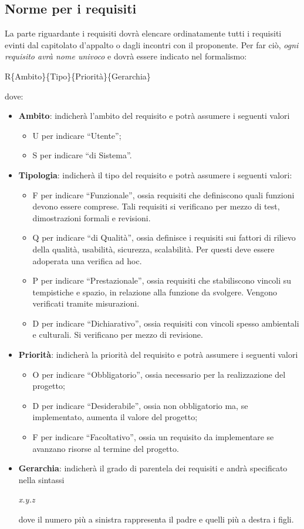 \subsection{Norme per i requisiti}
La parte riguardante i requisiti dovrà elencare ordinatamente tutti i requisiti evinti dal capitolato d'appalto o dagli incontri con il proponente. Per far ciò, \textit{ogni requisito avrà nome univoco} e dovrà essere indicato nel formalismo:
\begin{center}
R\{Ambito\}\{Tipo\}\{Priorità\}\{Gerarchia\}
\end{center}
dove:
\begin{itemize}
\item \textbf{Ambito}: indicherà l'ambito del requisito e potrà assumere i seguenti valori
\begin{itemize}
\item U per indicare ``Utente'';
\item S per indicare ``di Sistema''.
\end{itemize}
\item \textbf{Tipologia}: indicherà il tipo del requisito e potrà assumere i seguenti valori:
\begin{itemize}
\item F per indicare ``Funzionale'', ossia requisiti che definiscono quali funzioni devono essere comprese. Tali requisiti si verificano per mezzo di test, dimostrazioni formali e revisioni.
\item Q per indicare ``di Qualità'', ossia definisce i requisiti sui fattori di rilievo della qualità, usabilità, sicurezza, scalabilità. Per questi deve essere adoperata una verifica ad hoc.
\item P per indicare ``Prestazionale'', ossia requisiti che stabiliscono vincoli su tempistiche e spazio, in relazione alla funzione da svolgere. Vengono verificati tramite misurazioni.
\item D per indicare ``Dichiarativo'', ossia requisiti con vincoli spesso ambientali e culturali. Si verificano per mezzo di revisione.

\end{itemize}
\item \textbf{Priorità}: indicherà la priorità del requisito e potrà assumere i seguenti valori
\begin{itemize}
\item O per indicare ``Obbligatorio'', ossia necessario per la realizzazione del progetto;
\item D per indicare ``Desiderabile'', ossia non obbligatorio ma, se implementato, aumenta il valore del progetto;
\item F per indicare ``Facoltativo'', ossia un requisito da implementare se avanzano risorse al termine del progetto.
\end{itemize}
\item \textbf{Gerarchia}: indicherà il grado di parentela dei requisiti e andrà specificato nella sintassi
\begin{center}
\textit{x.y.z}
\end{center}
dove il numero più a sinistra rappresenta il padre e quelli più a destra i figli.
\end{itemize}
